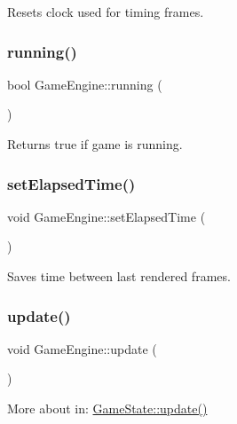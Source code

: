 Resets clock used for timing frames. 

\mbox{\label{class_game_engine_ab3f9945e3cb77c3ae0a7e0c91c22c19a}} 
\subsubsection{\texorpdfstring{running()}{running()}}
{\footnotesize\ttfamily bool Game\+Engine\+::running (\begin{DoxyParamCaption}{ }\end{DoxyParamCaption})\hspace{0.3cm}{\ttfamily [inline]}}



Returns true if game is running. 

\mbox{\label{class_game_engine_a579b1c7d9ca8d4cb9f788824f969ae68}} 
\subsubsection{\texorpdfstring{setElapsedTime()}{setElapsedTime()}}
{\footnotesize\ttfamily void Game\+Engine\+::set\+Elapsed\+Time (\begin{DoxyParamCaption}{ }\end{DoxyParamCaption})\hspace{0.3cm}{\ttfamily [inline]}}



Saves time between last rendered frames. 

\mbox{\label{class_game_engine_ae03241b464040b659b6a91f27920e8c3}} 
\subsubsection{\texorpdfstring{update()}{update()}}
{\footnotesize\ttfamily void Game\+Engine\+::update (\begin{DoxyParamCaption}{ }\end{DoxyParamCaption})}



More about in\+: \mbox{\hyperlink{class_game_state_a66b11afe355a9479f94aaf76576980bd}{Game\+State\+::update()}} 




